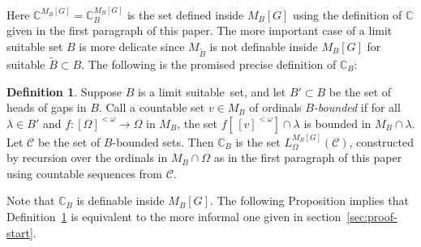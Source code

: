 \documentclass[
twoside,
]{article}
\theoremstyle{definition}
\newtheorem{definition}[theorem]{Definition}
\theoremstyle{remark}
\newcommand{\LS}{limit suitable}
\newcommand{\ords}{\Omega}
\newcommand\chang{\mathbb{C}}
\begin{document}
  Here $\chang^{M_B[G]}=\chang_B^{M_B[G]}$ is the set defined inside
  $M_B[G]$ using the definition of $\chang$ given in the first
  paragraph of this paper.  
  The more important case of a limit suitable set $B$ is more delicate since
  $M_{\tilde B}$ is not definable inside $M_B[G]$ for suitable $\tilde
  B\subset B$.   The following is the promised precise definition of
  $\chang_B$:
  \begin{definition}
    \label{def:changBdef}
    Suppose $B$ is a \LS\ set,  and let $B'\subset B$ be the set of heads of
    gaps in $B$.   Call a countable set $v\in M_B$ of ordinals
    \emph{$B$-bounded} if for all $\lambda\in B'$ and 
    $f\colon[\ords]^{<\omega}\to\ords$ in $M_B$,  the set
    $f[\,[v]^{<\omega}]\cap\lambda$ is bounded in $M_B\cap\lambda$.
    Let $\mathcal{C}$ be the set of $B$-bounded sets.
    Then $\chang_B$ is the set $L_{\ords}^{M_B[G]}(\mathcal{C})$,
    constructed by recursion over the
    ordinals in $M_B\cap\ords$ as in the first paragraph of this paper
    using countable sequences from 
    $\mathcal{C}$.
  \end{definition}
  Note that $\chang_{B}$ is definable inside $M_B[G]$.   The following
  Proposition implies that  Definition~\ref{def:changBdef}
  is equivalent to the more
  informal one given in section~\ref{sec:proof-start}.
  
\end{document}
